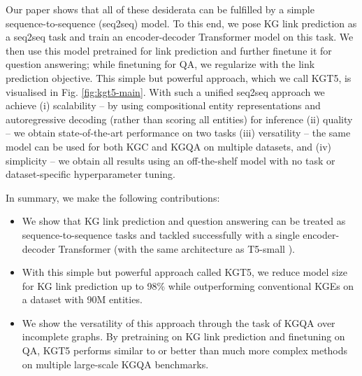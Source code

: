 \documentclass[11pt]{article}
\renewcommand\:{\colon} \newcommand{\sset}[1]{\left\{\,#1\,\right\}} \newcommand{\ssets}[1]{\left\{#1\right\}} \newcommand{\ssetn}[1]{\{\,#1\,\}}
\newcommand{\method}{\textsc{KGT5}}
\begin{document}
Our paper shows that all of these desiderata can be fulfilled by a simple sequence-to-sequence (seq2seq) model. To this end, we pose KG link prediction as a seq2seq task and train an encoder-decoder Transformer model \cite{vaswani2017attention} on this task. We then use this model pretrained for link prediction and further finetune it for question answering; while finetuning for QA, we regularize with the link prediction objective. 
This simple but powerful approach, which we call \method{}, is visualised in Fig. \ref{fig:kgt5-main}. 
With such a unified seq2seq approach we achieve 
(i) scalability -- by using compositional entity representations and autoregressive decoding (rather than scoring all entities) for inference
(ii) quality -- we obtain state-of-the-art performance on two tasks 
(iii) versatility -- the same model can be used for both KGC and KGQA on multiple datasets, and 
(iv) simplicity -- we obtain all results using an off-the-shelf model with no task or dataset-specific hyperparameter tuning.












\noindent In summary, we make the following contributions: 
\begin{itemize}
    \item We show that KG link prediction and question answering can be treated as sequence-to-sequence tasks and tackled successfully with a single encoder-decoder Transformer 
    (with the same architecture as T5-small \cite{raffel2020exploring}).
\item With this simple but powerful approach called \method{}, we reduce model size for KG link prediction up to 98\% while outperforming conventional KGEs on a dataset with 90M entities.
\item We show the versatility of this approach through the task of KGQA over incomplete graphs. By pretraining on KG link prediction and finetuning on QA, KGT5 performs similar to or better than much more complex methods on multiple large-scale KGQA benchmarks. 
\end{itemize}
\end{document}
